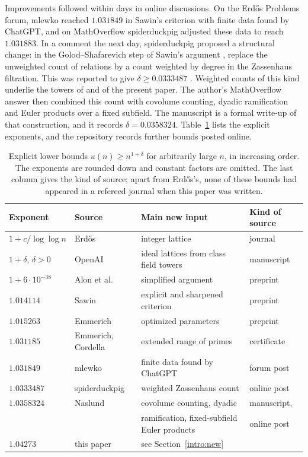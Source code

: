 Improvements followed within days in online discussions. On the
Erd\H{o}s Problems forum, mlewko \cite{ErdosProblems90} reached
$1.031849$ in Sawin's criterion with finite data found by ChatGPT, and
on MathOverflow spiderduckpig \cite{SpiderduckpigMO2026} adjusted these
data to reach $1.031883$. In a comment the next day, spiderduckpig
proposed a structural change: in the Golod--Shafarevich step of Sawin's
argument \cite[Lemma~11]{Sawin2026}, replace the unweighted count of
relations by a count weighted by degree in the Zassenhaus filtration.
This was reported to give $\delta\ge0.0333487$
\cite{SpiderduckpigMO2026}. Weighted counts of this kind underlie the
towers of \cite{Naslund0358} and of the present paper. The author's
MathOverflow answer \cite{NaslundMO2026} then combined this count with
covolume counting, dyadic ramification and Euler products over a fixed
subfield. The manuscript \cite{Naslund0358} is a formal write-up of that
construction, and it records $\delta=0.0358324$.
Table~\ref{intro:table-bounds} lists the explicit exponents, and the
repository \cite{TaoConstants84a} records further bounds posted online.

\begin{table}[htbp]
\centering
\caption{Explicit lower bounds $u(n)\ge n^{1+\delta}$ for arbitrarily
large $n$, in increasing order. The exponents are rounded down and
constant factors are omitted. The last column gives the kind of source;
apart from Erd\H{o}s's, none of these bounds had appeared in a refereed
journal when this paper was written.}
\label{intro:table-bounds}
\small
\begin{tabular}{@{}llll@{}}
\toprule
Exponent & Source & Main new input & Kind of source\\
\midrule
$1+c/\log\log n$ & Erd\H{o}s \cite{Erdos1946} & integer lattice & journal\\
$1+\delta$, $\delta>0$ & OpenAI \cite{OpenAI2026} & ideal lattices from class field towers & manuscript\\
$1+6\cdot10^{-38}$ & Alon et al.\ \cite{Alon2026} & simplified argument & preprint\\
$1.014114$ & Sawin \cite{Sawin2026} & explicit and sharpened criterion & preprint\\
$1.015263$ & Emmerich \cite{Emmerich2026} & optimized parameters & preprint\\
$1.031185$ & Emmerich, Cordella \cite{EmmerichCordella2026} & extended range of primes & certificate\\
$1.031849$ & mlewko \cite{ErdosProblems90} & finite data found by ChatGPT & forum post\\
$1.0333487$ & spiderduckpig \cite{SpiderduckpigMO2026} & weighted Zassenhaus count & online post\\
$1.0358324$ & Naslund \cite{Naslund0358,NaslundMO2026} & covolume counting, dyadic & manuscript,\\
 & & ramification, fixed-subfield Euler products & online post\\
$1.04273$ & this paper & see Section~\ref{intro:new} & \\
\bottomrule
\end{tabular}
\end{table}


